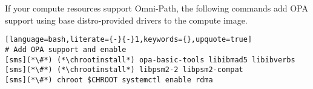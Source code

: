 If your compute resources support Omni-Path, the following commands add OPA
support using base distro-provided drivers to the compute image. 

\begin{lstlisting}[language=bash,literate={-}{-}1,keywords={},upquote=true]
# Add OPA support and enable
[sms](*\#*) (*\chrootinstall*) opa-basic-tools libibmad5 libibverbs
[sms](*\#*) (*\chrootinstall*) libpsm2-2 libpsm2-compat
[sms](*\#*) chroot $CHROOT systemctl enable rdma
\end{lstlisting}
